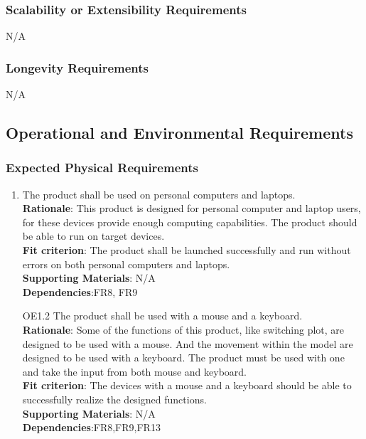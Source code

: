 \documentclass{article}
\begin{document}
\subsubsection{Scalability or Extensibility Requirements}
N/A
\subsubsection{Longevity Requirements}
N/A

\subsection{Operational and Environmental Requirements}
\subsubsection{Expected Physical Requirements}

\begin{enumerate}[OE1.1]
    \item The product shall be used on personal computers and laptops.\\
    \textbf{Rationale}: This product is designed for personal computer and laptop users, for these
     devices provide enough computing capabilities. The product should be able to run on target
      devices.\\
    \textbf{Fit criterion}: The product shall be launched successfully and run without errors on both
     personal computers and laptops.\\
\textbf{Supporting Materials}: N/A\\
\textbf{Dependencies}:FR8, FR9\\
   
    \item[OE1.2] The product shall be used with a mouse and a keyboard.\\
    \textbf{Rationale}: Some of the functions of this product, like switching plot, are designed to be used with a mouse. And the movement within the model are designed to be used with a keyboard. The product must be used with one and take the input from both mouse and keyboard.\\
    \textbf{Fit criterion}: The devices with a mouse and a keyboard should be able to successfully realize the designed functions.\\
\textbf{Supporting Materials}: N/A\\
\textbf{Dependencies}:FR8,FR9,FR13\\

\end{enumerate}
\end{document}
